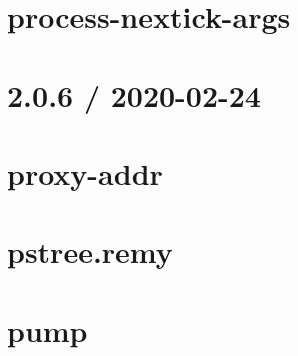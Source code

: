 \let\mypdfximage\pdfximage\def\pdfximage{\immediate\mypdfximage}\documentclass[twoside]{book}
\newcommand{\+}{\discretionary{\mbox{\scriptsize$\hookleftarrow$}}{}{}}
\begin{document}
\chapter{process-\/nextick-\/args}
\label{md__c_1__git_hub__p_r_o_y_e_c_t_o-_i_i_i-_g_o_t_rest-api-node-mysql_node_modules_process-nextick-args_readme}

\chapter{2.0.6 / 2020-\/02-\/24}
\label{md__c_1__git_hub__p_r_o_y_e_c_t_o-_i_i_i-_g_o_t_rest-api-node-mysql_node_modules_proxy-addr__h_i_s_t_o_r_y}

\chapter{proxy-\/addr}
\label{md__c_1__git_hub__p_r_o_y_e_c_t_o-_i_i_i-_g_o_t_rest-api-node-mysql_node_modules_proxy-addr__r_e_a_d_m_e}

\chapter{pstree.\+remy}
\label{md__c_1__git_hub__p_r_o_y_e_c_t_o-_i_i_i-_g_o_t_rest-api-node-mysql_node_modules_pstree_8remy__r_e_a_d_m_e}

\chapter{pump}
\label{md__c_1__git_hub__p_r_o_y_e_c_t_o-_i_i_i-_g_o_t_rest-api-node-mysql_node_modules_pump__r_e_a_d_m_e}

\end{document}

